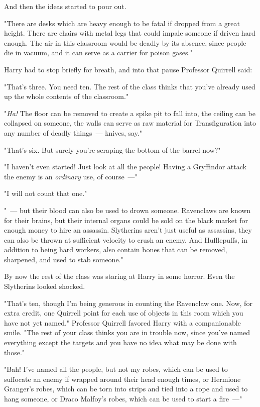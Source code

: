And then the ideas started to pour out.

"There are desks which are heavy enough to be fatal if dropped from a great
height. There are chairs with metal legs that could impale someone if driven
hard enough. The air in this classroom would be deadly by its absence, since
people die in vacuum, and it can serve as a carrier for poison gases."

Harry had to stop briefly for breath, and into that pause Professor Quirrell
said:

"That's three. You need ten. The rest of the class thinks that you've already
used up the whole contents of the classroom."

"\emph{Ha!} The floor can be removed to create a spike pit to fall into, the
ceiling can be collapsed on someone, the walls can serve as raw material for
Transfiguration into any number of deadly things~--- knives, say."

"That's six. But surely you're scraping the bottom of the barrel now?"

"I haven't even started! Just look at all the people! Having a Gryffindor
attack the enemy is an \emph{ordinary} use, of course~---"

"I will not count that one."

"~--- but their blood can also be used to drown someone. Ravenclaws are known for
their brains, but their internal organs could be sold on the black market for
enough money to hire an assassin. Slytherins aren't just useful as assassins,
they can also be thrown at sufficient velocity to crush an enemy. And
Hufflepuffs, in addition to being hard workers, also contain bones that can be
removed, sharpened, and used to stab someone."

By now the rest of the class was staring at Harry in some horror. Even the
Slytherins looked shocked.

"That's ten, though I'm being generous in counting the Ravenclaw one. Now, for
extra credit, one Quirrell point for each use of objects in this room which you
have not yet named." Professor Quirrell favored Harry with a companionable
smile. "The rest of your class thinks you are in trouble now, since you've
named everything except the targets and you have no idea what may be done with
those."

"Bah! I've named all the people, but not my robes, which can be used to
suffocate an enemy if wrapped around their head enough times, or Hermione
Granger's robes, which can be torn into strips and tied into a rope and used to
hang someone, or Draco Malfoy's robes, which can be used to start a fire~---"

